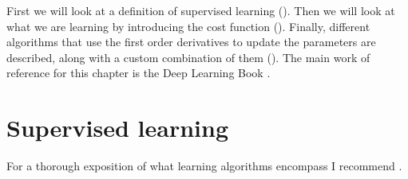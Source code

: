First we will look at a definition of supervised learning ().
Then we will look at what we are learning by introducing the cost function ().
Finally, different algorithms that use the first order derivatives to update the parameters are described, along with a custom combination of them ().
The main work of reference for this chapter is the Deep Learning Book \cite{goodfellowDeepLearning2016}.
\section{Supervised learning}
\label{sec:suplearning}
For a thorough exposition of what learning algorithms encompass I recommend \cite[see][sec 5.1]{goodfellowDeepLearning2016}.

